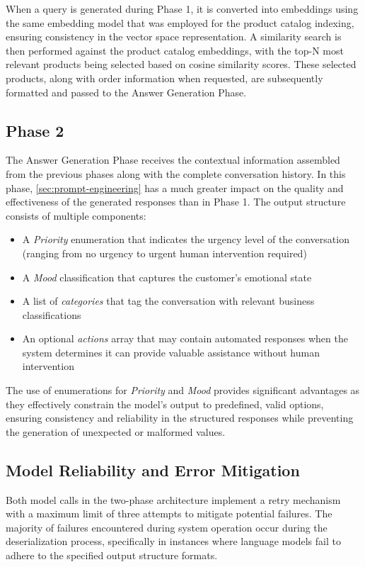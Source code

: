 When a query is generated during Phase 1, it is converted into embeddings using the same embedding model that was employed for the product catalog indexing, ensuring consistency in the vector space representation.
A similarity search is then performed against the product catalog embeddings, with the top-N most relevant products being selected based on cosine similarity scores.
These selected products, along with order information when requested, are subsequently formatted and passed to the Answer Generation Phase.

\subsection{Phase 2}

The Answer Generation Phase receives the contextual information assembled from the previous phases along with the complete conversation history.
In this phase, \cref{sec:prompt-engineering} has a much greater impact on the quality and effectiveness of the generated responses than in Phase 1.
The output structure consists of multiple components:
\begin{itemize}
    \item A \textit{Priority} enumeration that indicates the urgency level of the conversation (ranging from no urgency to urgent human intervention required)
    \item A \textit{Mood} classification that captures the customer's emotional state
    \item A list of \textit{categories} that tag the conversation with relevant business classifications
    \item An optional \textit{actions} array that may contain automated responses when the system determines it can provide valuable assistance without human intervention
\end{itemize}
The use of enumerations for  \textit{Priority} and  \textit{Mood} provides significant advantages as they effectively constrain the model's output to predefined, valid options, ensuring consistency and reliability in the structured responses while preventing the generation of unexpected or malformed values.

\subsection{Model Reliability and Error Mitigation}

Both model calls in the two-phase architecture implement a retry mechanism with a maximum limit of three attempts to mitigate potential failures.
The majority of failures encountered during system operation occur during the deserialization process, specifically in instances where language models fail to adhere to the specified output structure formats.

